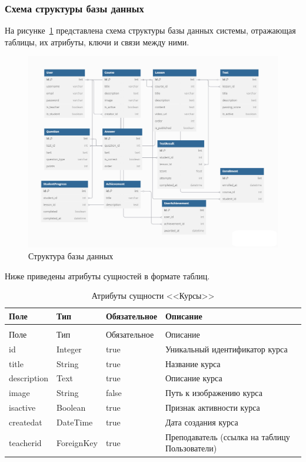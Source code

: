\subsubsection{Схема структуры базы данных}

На рисунке~\ref{bd:image} представлена схема структуры базы данных системы, отражающая таблицы, их атрибуты, ключи и связи между ними.

\begin{landscape}
	\begin{figure}[ht]
		\centering
		\includegraphics[width=1.3\textwidth]{images/бд} 
		\caption{Структура базы данных}
		\label{bd:image}
	\end{figure}
\end{landscape}

Ниже приведены атрибуты сущностей в формате таблиц.

\begin{xltabular}{\textwidth}{|l|l|p{3.2cm}|X|}
	\caption{Атрибуты сущности <<Курсы>>\label{courses:table}}\\ \hline
	Поле & Тип & Обязательное & Описание \\ \hline
	\endfirsthead
	\\ \hline
	Поле & Тип & Обязательное & Описание \\ \hline
	\endhead
	id & Integer & true & Уникальный идентификатор курса \\ \hline
	title & String & true & Название курса \\ \hline
	description & Text & true & Описание курса \\ \hline
	image & String & false & Путь к изображению курса \\ \hline
	isactive & Boolean & true & Признак активности курса \\ \hline
	createdat & DateTime & true & Дата создания курса \\ \hline
	teacherid & ForeignKey & true & Преподаватель (ссылка на таблицу Пользователи) \\ \hline
\end{xltabular}

